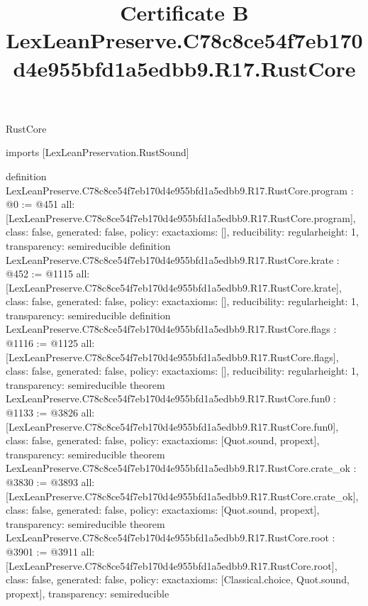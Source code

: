 \begin{lexlean}{RustCore}
\title{Certificate B LexLeanPreserve.C78c8ce54f7eb170d4e955bfd1a5edbb9.R17.RustCore}
\begin{coremodule}
imports [LexLeanPreservation.RustSound]

definition LexLeanPreserve.C78c8ce54f7eb170d4e955bfd1a5edbb9.R17.RustCore.program : @0 := @451 {
  all: [LexLeanPreserve.C78c8ce54f7eb170d4e955bfd1a5edbb9.R17.RustCore.program],
  class: false,
  generated: false,
  policy: exact{axioms: []},
  reducibility: regular{height: 1},
  transparency: semireducible
}
definition LexLeanPreserve.C78c8ce54f7eb170d4e955bfd1a5edbb9.R17.RustCore.krate : @452 := @1115 {
  all: [LexLeanPreserve.C78c8ce54f7eb170d4e955bfd1a5edbb9.R17.RustCore.krate],
  class: false,
  generated: false,
  policy: exact{axioms: []},
  reducibility: regular{height: 1},
  transparency: semireducible
}
definition LexLeanPreserve.C78c8ce54f7eb170d4e955bfd1a5edbb9.R17.RustCore.flags : @1116 := @1125 {
  all: [LexLeanPreserve.C78c8ce54f7eb170d4e955bfd1a5edbb9.R17.RustCore.flags],
  class: false,
  generated: false,
  policy: exact{axioms: []},
  reducibility: regular{height: 1},
  transparency: semireducible
}
theorem LexLeanPreserve.C78c8ce54f7eb170d4e955bfd1a5edbb9.R17.RustCore.fun0 : @1133 := @3826 {
  all: [LexLeanPreserve.C78c8ce54f7eb170d4e955bfd1a5edbb9.R17.RustCore.fun0],
  class: false,
  generated: false,
  policy: exact{axioms: [Quot.sound, propext]},
  transparency: semireducible
}
theorem LexLeanPreserve.C78c8ce54f7eb170d4e955bfd1a5edbb9.R17.RustCore.crate_ok : @3830 := @3893 {
  all: [LexLeanPreserve.C78c8ce54f7eb170d4e955bfd1a5edbb9.R17.RustCore.crate_ok],
  class: false,
  generated: false,
  policy: exact{axioms: [Quot.sound, propext]},
  transparency: semireducible
}
theorem LexLeanPreserve.C78c8ce54f7eb170d4e955bfd1a5edbb9.R17.RustCore.root : @3901 := @3911 {
  all: [LexLeanPreserve.C78c8ce54f7eb170d4e955bfd1a5edbb9.R17.RustCore.root],
  class: false,
  generated: false,
  policy: exact{axioms: [Classical.choice, Quot.sound, propext]},
  transparency: semireducible
}


\end{coremodule}
\end{lexlean}
